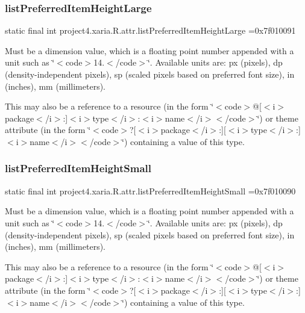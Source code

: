 \subsubsection{\texorpdfstring{list\+Preferred\+Item\+Height\+Large}{listPreferredItemHeightLarge}}
{\footnotesize\ttfamily static final int project4.\+xaria.\+R.\+attr.\+list\+Preferred\+Item\+Height\+Large =0x7f010091\hspace{0.3cm}{\ttfamily [static]}}

Must be a dimension value, which is a floating point number appended with a unit such as \char`\"{}$<$code$>$14.\+5sp$<$/code$>$\char`\"{}. Available units are\+: px (pixels), dp (density-\/independent pixels), sp (scaled pixels based on preferred font size), in (inches), mm (millimeters). 

This may also be a reference to a resource (in the form \char`\"{}$<$code$>$@\mbox{[}$<$i$>$package$<$/i$>$\+:\mbox{]}$<$i$>$type$<$/i$>$\+:$<$i$>$name$<$/i$>$$<$/code$>$\char`\"{}) or theme attribute (in the form \char`\"{}$<$code$>$?\mbox{[}$<$i$>$package$<$/i$>$\+:\mbox{]}\mbox{[}$<$i$>$type$<$/i$>$\+:\mbox{]}$<$i$>$name$<$/i$>$$<$/code$>$\char`\"{}) containing a value of this type. \mbox{\label{classproject4_1_1xaria_1_1R_1_1attr_a06003d185f8e606478018a782d0d8c95}} 
\subsubsection{\texorpdfstring{list\+Preferred\+Item\+Height\+Small}{listPreferredItemHeightSmall}}
{\footnotesize\ttfamily static final int project4.\+xaria.\+R.\+attr.\+list\+Preferred\+Item\+Height\+Small =0x7f010090\hspace{0.3cm}{\ttfamily [static]}}

Must be a dimension value, which is a floating point number appended with a unit such as \char`\"{}$<$code$>$14.\+5sp$<$/code$>$\char`\"{}. Available units are\+: px (pixels), dp (density-\/independent pixels), sp (scaled pixels based on preferred font size), in (inches), mm (millimeters). 

This may also be a reference to a resource (in the form \char`\"{}$<$code$>$@\mbox{[}$<$i$>$package$<$/i$>$\+:\mbox{]}$<$i$>$type$<$/i$>$\+:$<$i$>$name$<$/i$>$$<$/code$>$\char`\"{}) or theme attribute (in the form \char`\"{}$<$code$>$?\mbox{[}$<$i$>$package$<$/i$>$\+:\mbox{]}\mbox{[}$<$i$>$type$<$/i$>$\+:\mbox{]}$<$i$>$name$<$/i$>$$<$/code$>$\char`\"{}) containing a value of this type. \mbox{\label{classproject4_1_1xaria_1_1R_1_1attr_a96f5187972e26c32886ae99940851b40}} 
